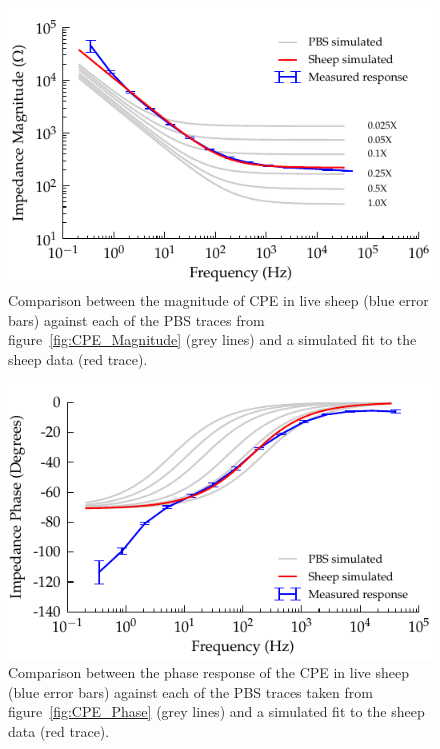 \documentclass[journal, a4paper]{IEEEtran}
\begin{document}
\begin{figure}
    \begin{center}
        \includegraphics{graphics/displacement-withSheep_impedanceVsFrequency_magnitude}
    \end{center}
    \caption{Comparison between the magnitude of CPE in live sheep (blue error bars) against each of the PBS traces from figure~\ref{fig:CPE_Magnitude} (grey lines) and a simulated fit to the sheep data (red trace).}
    \label{fig:displacement_sheepCPEMagnitude}
\end{figure}

\begin{figure}
    \begin{center}
        \includegraphics{graphics/displacement-withSheep_impedanceVsFrequency_phase}
    \end{center}
    \caption{Comparison between the phase response of the CPE in live sheep (blue error bars) against each of the PBS traces taken from figure~\ref{fig:CPE_Phase} (grey lines) and a simulated fit to the sheep data (red trace).}
    \label{fig:displacement_sheepCPEPhase}
\end{figure}
\end{document}
